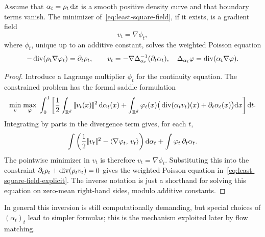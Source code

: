 \begin{prop}\label{prop-least-square-gradient-velocity}
	Assume that $\alpha_t=\rho_t\,\mathrm{d} x$ is a smooth positive density curve and that boundary terms vanish. The minimizer of~\eqref{eq:least-square-field}, if it exists, is a gradient field
	\[
		v_t=\nabla\phi_t,
	\]
	where $\phi_t$, unique up to an additive constant, solves the weighted Poisson equation
	\begin{equation}\label{eq:least-square-field-explicit}
		-\operatorname{div}(\rho_t\nabla\varphi_t)=\partial_t\rho_t,
		\qquad
		v_t=-\nabla\Delta_{\alpha_t}^{-1}(\partial_t\alpha_t),
		\quad
		\Delta_{\alpha_t}\varphi=\operatorname{div}(\alpha_t\nabla\varphi).
	\end{equation}
\end{prop}

\begin{proof}
	Introduce a Lagrange multiplier $\phi_t$ for the continuity equation. The constrained problem has the formal saddle formulation
	\[
		\underset{v}{\min}\;\underset{\varphi}{\max}\;
		\int_0^1
		\left[
			\frac12\int_{\mathbb{R}^d}|\!| v_t(x) |\!|^2\,\mathrm{d}\alpha_t(x)
			+\int_{\mathbb{R}^d}\varphi_t(x)\big(\operatorname{div}(\alpha_t v_t)(x)+\partial_t\alpha_t(x)\big)\mathrm{d} x
		\right]\mathrm{d} t.
	\]
	Integrating by parts in the divergence term gives, for each $t$,
	\[
		\int \left(\frac12|\!| v_t |\!|^2-\langle \nabla\varphi_t,\,v_t\rangle\right)\mathrm{d}\alpha_t
		+
		\int \varphi_t\,\partial_t\alpha_t .
	\]
	The pointwise minimizer in $v_t$ is therefore $v_t=\nabla\phi_t$. Substituting this into the constraint $\partial_t\rho_t+\operatorname{div}(\rho_t v_t)=0$ gives the weighted Poisson equation in~\eqref{eq:least-square-field-explicit}. The inverse notation is just a shorthand for solving this equation on zero-mean right-hand sides, modulo additive constants.
\end{proof}

In general this inversion is still computationally demanding, but special choices of $(\alpha_t)_t$ lead to simpler formulas; this is the mechanism exploited later by flow matching.

